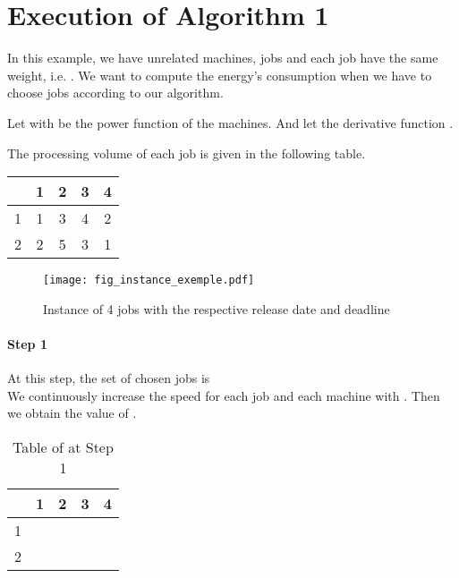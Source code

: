 \documentclass[11pt,a4paper]{article}
\begin{document}

 
\appendix
\section{Execution of Algorithm 1}

In this example, we have  unrelated machines,  jobs and each job have the same weight, i.e.
. We want to compute the energy's consumption when we have to choose 
 jobs according to our algorithm.

Let  with  be the power function of the machines.
And let the derivative function .

The processing volume of each job is given in the following table.
\begin{center}
\begin{tabular}{|c|c|c|c|c|}
\hline 
 & 1 & 2 & 3 & 4 \\ 
\hline 
1 & 1 & 3 & 4 & 2 \\ 
\hline 
2 & 2 & 5 & 3 & 1 \\ 
\hline 
\end{tabular} 
\end{center}

\begin{figure}[h]
\begin{center}
\texttt{[image: fig\_instance\_exemple.pdf]}
\caption{Instance of 4 jobs with the respective release date and deadline}
\label{exemple_appendix}
\end{center}
\end{figure}


\paragraph{Step 1}
At this step, the set of chosen jobs is \\

We continuously increase the speed  for each job  and each machine  with .
Then we obtain the value of .


\begin{table}[H]
\centering
\begin{tabular}{|c|c|c|c|c|}
\hline 
 & 1 & 2 & 3 & 4 \\ 
\hline 
1 &  &  &  &  \\ 
\hline 
2 &  &  &  &  \\ 
\hline 
\end{tabular} 
\caption{Table of  at Step 1}
\end{table}
\end{document}
